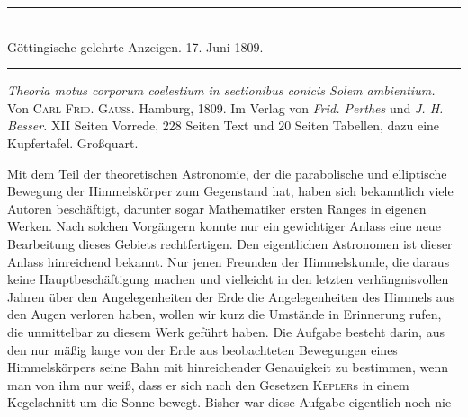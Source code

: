 \begin{center}\rule{.75\textwidth}{.3pt}\\
Göttingische gelehrte Anzeigen. 17. Juni 1809.\\
\rule{.75\textwidth}{.3pt}\end{center}
\textit{Theoria motus corporum coelestium in sectionibus conicis Solem ambientium.} Von \textsc{Carl Frid. Gauß.} Hamburg, 1809. Im Verlag von \textit{Frid. Perthes} und \textit{J. H. Besser.} XII Seiten Vorrede, 228 Seiten Text und 20 Seiten Tabellen, dazu eine Kupfertafel. Großquart.

Mit dem Teil der theoretischen Astronomie, der die parabolische und elliptische Bewegung der Himmelskörper zum Gegenstand hat, haben sich bekanntlich viele Autoren beschäftigt, darunter sogar Mathematiker ersten Ranges in eigenen Werken. Nach solchen Vorgängern konnte nur ein gewichtiger Anlass eine neue Bearbeitung dieses Gebiets rechtfertigen. Den eigentlichen Astronomen ist dieser Anlass hinreichend bekannt. Nur jenen Freunden der Himmelskunde, die daraus keine Hauptbeschäftigung machen und vielleicht in den letzten verhängnisvollen Jahren über den Angelegenheiten der Erde die Angelegenheiten des Himmels aus den Augen verloren haben, wollen wir kurz die Umstände in Erinnerung rufen, die unmittelbar zu diesem Werk geführt haben. Die Aufgabe besteht darin, aus den nur mäßig lange von der Erde aus beobachteten Bewegungen eines Himmelskörpers seine Bahn mit hinreichender Genauigkeit zu bestimmen, wenn man von ihm nur weiß, dass er sich nach den Gesetzen \textsc{Kepler}s in einem Kegelschnitt um die Sonne bewegt. Bisher war diese Aufgabe eigentlich noch nie
